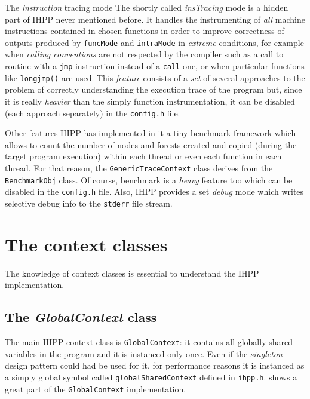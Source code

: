 \documentclass[a4paper,10pt]{report}
\begin{document}
\begin{paragraph}{The \emph{instruction} tracing mode}
The shortly called \emph{insTracing} mode is a hidden part of IHPP never
mentioned before. It handles the instrumenting of \emph{all} machine instructions
contained in chosen functions in order to improve correctness 
of outputs produced by \verb|funcMode| and \verb|intraMode| 
in \emph{extreme} conditions, for example when \emph{calling conventions} are not
respected by the compiler such as a call to routine with a \verb|jmp| instruction 
instead of a \verb|call| one, or when particular functions like \verb|longjmp()| are used.
This \emph{feature} consists of a \emph{set} of several approaches to the problem 
of correctly understanding the execution trace of the program but, 
since it is really \emph{heavier} than the simply function instrumentation,
it can be disabled (each approach separately) in the \verb|config.h| file.
\end{paragraph}

\begin{paragraph}{Other features}
IHPP has implemented in it a tiny benchmark framework which allows 
to count the number of nodes and forests created and copied (during the 
target program execution) within each
thread or even each function in each thread. For that reason,
the \verb|GenericTraceContext| class derives from the \verb|BenchmarkObj| class.
Of course, benchmark is a \emph{heavy} feature too which can be disabled 
in the \verb|config.h| file. Also, IHPP provides a set \emph{debug} mode
which writes selective debug info to the \verb|stderr| file stream.
\end{paragraph}

\section{The context classes}

The knowledge of context classes is essential to understand the IHPP implementation.

\subsection{The \emph{GlobalContext} class}
The main IHPP context class is \verb|GlobalContext|: it contains all globally shared variables in the program and it is instanced only once. 
Even if the \emph{singleton} design pattern could had be used for it, for 
performance reasons it is instanced as a simply global symbol called \verb|globalSharedContext| defined in \verb|ihpp.h|.
 shows a great part of the \verb|GlobalContext| implementation.
\end{document}
